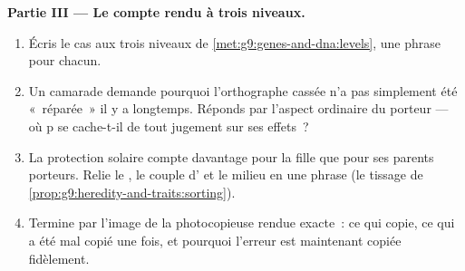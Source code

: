 \begin{problem}
\medskip\noindent\textbf{Partie III --- Le compte rendu à
trois niveaux.}
\begin{enumerate}[resume]
  \item Écris le cas aux trois niveaux de
        \cref{met:g9:genes-and-dna:levels}, une phrase pour
        chacun.
  \item Un camarade demande pourquoi l'orthographe cassée
        n'a pas simplement été «~réparée~» il y a
        longtemps. Réponds par l'aspect ordinaire du
        porteur --- où p se cache-t-il de tout jugement sur
        ses effets~?
  \item La protection solaire compte davantage pour la
        fille que pour ses parents porteurs. Relie le
        , le couple d' et le milieu en une
        phrase (le tissage de
        \cref{prop:g9:heredity-and-traits:sorting}).
  \item Termine par l'image de la photocopieuse rendue
        exacte~: ce qui copie, ce qui a été mal copié une
        fois, et pourquoi l'erreur est maintenant copiée
        fidèlement.
\end{enumerate}
\end{problem}
